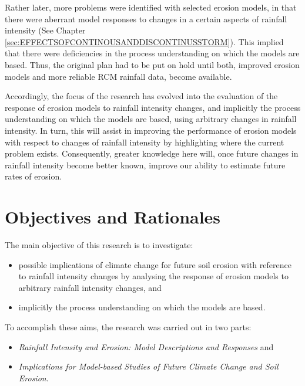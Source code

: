 Rather later, more problems were identified with selected erosion models, in
that there were aberrant model responses to changes in a certain aspects of
rainfall intensity (See Chapter
\ref{sec:EFFECTSOFCONTINOUSANDDISCONTINUSSTORM}). This implied that there were
deficiencies in the process understanding on which the models are based. Thus,
the original plan had to be put on hold until both, improved erosion models and
more reliable RCM rainfall data, become available.

Accordingly, the focus of the research has evolved into the evaluation of the
response of erosion models to rainfall intensity changes, and implicitly the
process understanding on which the models are based, using arbitrary changes in
rainfall intensity. In turn, this will assist in improving the performance of
erosion models with respect to changes of rainfall intensity by highlighting
where the current problem exists. Consequently, greater knowledge here will,
once future changes in rainfall intensity become better known, improve our
ability to estimate future rates of erosion.

\section{Objectives and Rationales}
\label{sec:ResearchObjectives}

The main objective of this research is to investigate:
\begin{itemize}
 \item possible implications of climate change for future soil erosion with
reference to rainfall intensity changes by analysing the response of erosion
models to arbitrary rainfall intensity changes, and
 \item implicitly the process understanding on which the models are based.
\end{itemize}
To accomplish these aims, the research was carried out in two parts:
\begin{itemize}
 \item \textit{Rainfall Intensity and Erosion: Model Descriptions and
Responses} and
 \item \textit{Implications for Model-based Studies of Future Climate Change and
Soil Erosion}.
\end{itemize}

